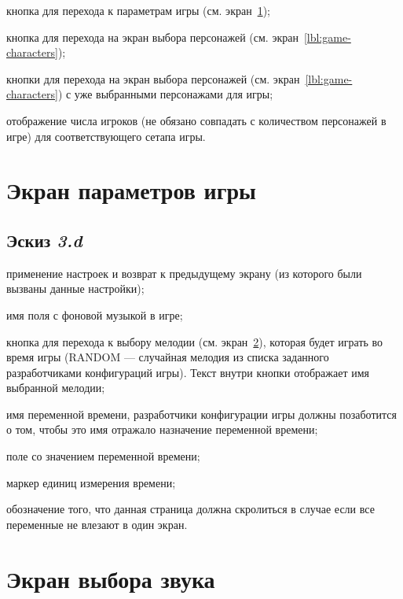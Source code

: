 \begin{enumerate*}
    \item кнопка для перехода к параметрам игры (см. экран~\ref{lbl:game-settings});
    \item кнопка для перехода на экран выбора персонажей (см. экран~\ref{lbl:game-characters});
    \item кнопки для перехода на экран выбора персонажей (см. экран~\ref{lbl:game-characters}) с уже выбранными персонажами для игры;
    \item отображение числа игроков (не обязано совпадать с количеством персонажей в игре) для соответствующего сетапа игры.
\end{enumerate*}

\section{Экран параметров игры}\label{lbl:game-settings}

\subsection{Эскиз \emph{3.d}}

\begin{enumerate*}
    \item применение настроек и возврат к предыдущему экрану (из которого были вызваны данные настройки);
    \item имя поля с фоновой музыкой в игре;
    \item кнопка для перехода к выбору мелодии (см. экран~\ref{lbl:sound-view}), которая будет играть во время игры (RANDOM --- случайная мелодия из списка заданного разработчиками конфигураций игры). Текст внутри кнопки отображает имя выбранной мелодии;
    \item имя переменной времени, разработчики конфигурации игры должны позаботится о том, чтобы это имя отражало назначение переменной времени;
    \item поле со значением переменной времени;
    \item маркер единиц измерения времени;
    \item обозначение того, что данная страница должна скролиться в случае если все переменные не влезают в один экран.
\end{enumerate*}

\section{Экран выбора звука}\label{lbl:sound-view}

